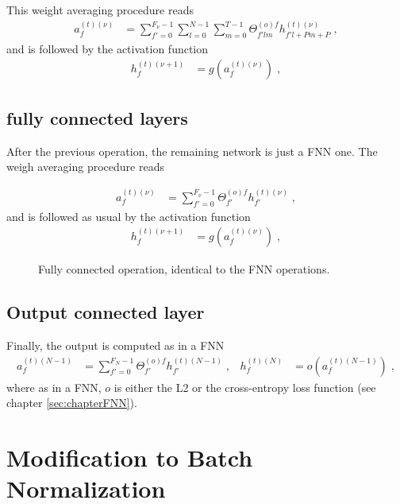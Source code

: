 This weight averaging procedure reads
\begin{align}
a_{f}^{(t)(\nu)}&=\sum^{F_\nu-1}_{f'=0}\sum^{N-1}_{l=0}
%
\sum^{T-1}_{m=0}\Theta^{(o)f}_{f'lm}h^{(t)(\nu)}_{f'l+Pm+P}\;,
\end{align}
and is followed by the activation function
\begin{align}
h_{f}^{(t)(\nu+1)}&=g\left(a_{f}^{(t)(\nu)}\right)\;,
\end{align}
\subsection{fully connected layers}

After the previous operation, the remaining network is just a FNN one. The weigh averaging procedure reads

\begin{align}
a_{f}^{(t)(\nu)}&=\sum^{F_\nu-1}_{f'=0}\Theta^{(o)f}_{f'}h^{(t)(\nu)}_{f'}\;,
\end{align}
and is followed as usual by the activation function
 \begin{align}
h_{f}^{(t)(\nu+1)}&=g\left(a_{f}^{(t)(\nu)}\right)\;,
\end{align}

\begin{figure}[H]
\begin{center}
\caption{Fully connected operation, identical to the FNN operations.}
\end{center}
\end{figure}

\subsection{Output connected layer}

Finally, the output is computed as in a FNN
\begin{align}
a_{f}^{(t)(N-1)}&=\sum^{F_{N}-1}_{f'=0}\Theta^{(o)f}_{f'}h^{(t)(N-1)}_{f'}\;,
&
h_{f}^{(t)(N)}&=o\left(a_{f}^{(t)(N-1)}\right)\;,
\end{align}
where as in a FNN, $o$ is either the L2 or the cross-entropy loss function (see chapter \ref{sec:chapterFNN}).

\section{Modification to Batch Normalization}


